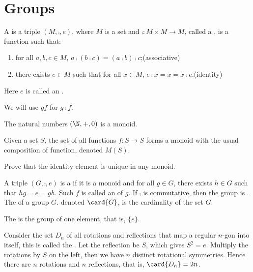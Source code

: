 \documentclass[10pt]{article}
\begin{document}
\newpage
\section{Groups}
\begin{definition}
    A  is a triple $(M,\comp,e)$, where $M$ is a set and $\comp:M\times M\to M$, called a , is a function such that:
    \begin{enumerate}
        \item for all $a,b,c\in M$, $a\comp(b\comp c)=(a\comp b)\comp c$;\hfill(associative)
        \item there exists $e\in M$ such that for all $x\in M$, $e\comp x=x=x\comp e$.\hfill(identity)
    \end{enumerate}
    Here $e$ is called an .
\end{definition}
\begin{remark}
    We will use $gf$ for $g\comp f$.
\end{remark}
\begin{example}
    The natural numbers $(\N,+,0)$ is a monoid.
\end{example}
\begin{example}
    Given a set $S$, the set of all functions $f:S\to S$ forms a monoid with the usual composition of function, denoted $M(S)$.
\end{example}
\begin{problem}
    Prove that the identity element is unique in any monoid.
\end{problem}
\begin{definition}
    A triple $(G,\comp,e)$ is a  if it is a monoid and for all $g\in G$, there exists $h\in G$ such that $hg=e=gh$. Such $f$ is called an  of $g$. If $\comp$ is commutative, then the group is . The  of a group $G$. denoted $\card{G}$, is the cardinality of the set $G$.
\end{definition}
\begin{example}
    The  is the group of one element, that is, $\{e\}$.
\end{example}
\begin{example}
    Consider the set ${D}_{n}$ of all rotations and reflections that map a regular $n$-gon into itself, this is called the . Let the reflection be $S$, which gives ${S}^{2}=e$. Multiply the rotations by $S$ on the left, then we have $n$ distinct rotational symmetries. Hence there are $n$ rotations and $n$ reflections, that is, $\card{{D}_{n}}=2n$.
\end{example}
\end{document}
